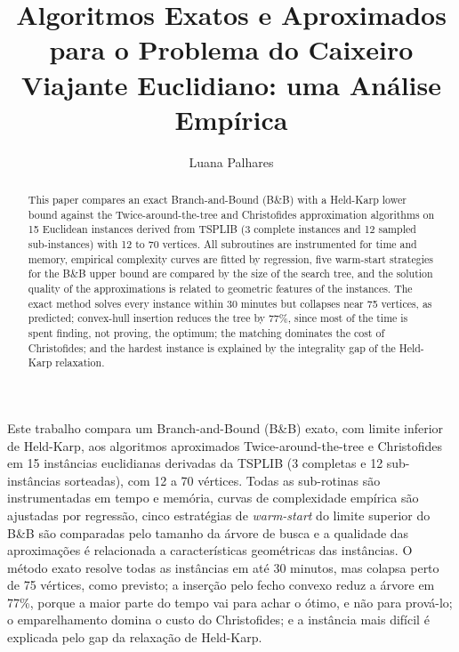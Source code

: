 \documentclass[12pt]{article}
\title{Algoritmos Exatos e Aproximados para o Problema do Caixeiro\\
  Viajante Euclidiano: uma Análise Empírica}
\author{Luana Palhares\inst{1}}
\begin{document}
\maketitle

\begin{abstract}
  This paper compares an exact Branch-and-Bound (B\&B) with a Held-Karp lower bound
  against the Twice-around-the-tree and Christofides approximation algorithms on 15
  Euclidean instances derived from TSPLIB (3 complete instances and 12 sampled
  sub-instances) with 12 to 70 vertices. All subroutines are instrumented
  for time and memory, empirical complexity curves are fitted by regression, five
  warm-start strategies for the B\&B upper bound are compared by the size of the search
  tree, and the solution quality of the approximations is related to geometric features
  of the instances. The exact method solves every instance within 30 minutes but
  collapses near 75 vertices, as predicted; convex-hull insertion reduces the tree by
  77\%, since most of the time is spent finding, not proving, the optimum; the matching
  dominates the cost of Christofides; and the hardest instance is explained by the
  integrality gap of the Held-Karp relaxation.
\end{abstract}

\begin{resumo}
  Este trabalho compara um Branch-and-Bound (B\&B) exato, com limite inferior de
  Held-Karp, aos algoritmos aproximados Twice-around-the-tree e Christofides em 15
  instâncias euclidianas derivadas da TSPLIB (3 completas e 12 sub-instâncias
  sorteadas), com 12 a 70 vértices. Todas as sub-rotinas são
  instrumentadas em tempo e memória, curvas de complexidade empírica são ajustadas por
  regressão, cinco estratégias de \emph{warm-start} do limite superior do B\&B são
  comparadas pelo tamanho da árvore de busca e a qualidade das aproximações é
  relacionada a características geométricas das instâncias. O método exato resolve todas
  as instâncias em até 30 minutos, mas colapsa perto de 75 vértices, como previsto; a
  inserção pelo fecho convexo reduz a árvore em 77\%, porque a maior parte do tempo vai
  para achar o ótimo, e não para prová-lo; o emparelhamento domina o custo do
  Christofides; e a instância mais difícil é explicada pelo gap da relaxação de Held-Karp.
\end{resumo}









\clearpage

\end{document}
